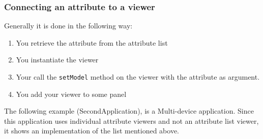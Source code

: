 \subsubsection{Connecting an attribute to a viewer}

Generally it is done in the following way:
\begin{enumerate}
\item You retrieve the attribute from the attribute list 
\item You instantiate the viewer 
\item Your call the \texttt{setModel} method on the viewer
with the attribute as argument. 
\item You add your viewer to some panel
\end{enumerate}
The following example (SecondApplication),
is a Multi-device application. Since this application uses individual
attribute viewers and not an attribute list viewer, it shows an implementation
of the list mentioned above.

